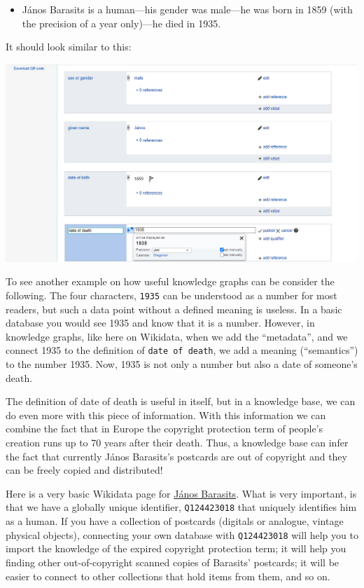 \documentclass[
  letterpaper,
  DIV=11,
  numbers=noendperiod]{scrreprt}
\providecommand{\tightlist}{%
  \setlength{\itemsep}{0pt}\setlength{\parskip}{0pt}}\usepackage{longtable,booktabs,array}
\begin{document}
\begin{itemize}
\tightlist
\item
  János Barasits is a human---his gender was male---he was born in 1859
  (with the precision of a year only)---he died in 1935.
\end{itemize}

It should look similar to this:

\begin{center}
\includegraphics{png/wikidata-tutorial/wikidata-create-new-item-Janos-Barasits-20240204-3.png}
\end{center}

To see another example on how useful knowledge graphs can be consider
the following. The four characters, \texttt{1935} can be understood as a
number for most readers, but such a data point without a defined meaning
is useless. In a basic database you would see 1935 and know that it is a
number. However, in knowledge graphs, like here on Wikidata, when we add
the ``metadata'', and we connect 1935 to the definition of
\texttt{date\ of\ death}, we add a meaning (``semantics'') to the number
1935. Now, 1935 is not only a number but also a date of someone's death.

The definition of date of death is useful in itself, but in a knowledge
base, we can do even more with this piece of information. With this
information we can combine the fact that in Europe the copyright
protection term of people's creation runs up to 70 years after their
death. Thus, a knowledge base can infer the fact that currently János
Barasits's postcards are out of copyright and they can be freely copied
and distributed!

Here is a very basic Wikidata page for
\href{https://www.wikidata.org/wiki/Q124423018}{János Barasits}. What is
very important, is that we have a globally unique identifier,
\texttt{Q124423018} that uniquely identifies him as a human. If you have
a collection of postcards (digitals or analogue, vintage physical
objects), connecting your own database with \texttt{Q124423018} will
help you to import the knowledge of the expired copyright protection
term; it will help you finding other out-of-copyright scanned copies of
Barasits' postcards; it will be easier to connect to other collections
that hold items from them, and so on.
\end{document}
